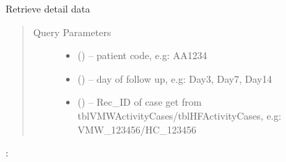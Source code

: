 \documentclass[letterpaper,10pt,english,openany,oneside]{sphinxmanual}
\begin{document}
\begin{fulllineitems}
\label{\detokenize{api/v4:get--api4-VMWFollowup-detail}}
\sphinxAtStartPar
Retrieve detail data
\begin{quote}\begin{description}
\item[{Query Parameters}] \leavevmode\begin{itemize}
\item {} 
\sphinxAtStartPar
{} () – patient code, e.g: AA1234

\item {} 
\sphinxAtStartPar
{} () – day of follow up, e.g: Day3, Day7, Day14

\item {} 
\sphinxAtStartPar
{} () – Rec\_ID of case get from tblVMWActivityCases/tblHFActivityCases, e.g: VMW\_123456/HC\_123456

\end{itemize}

\end{description}\end{quote}

\sphinxAtStartPar
{}:


\end{fulllineitems}
\end{document}
